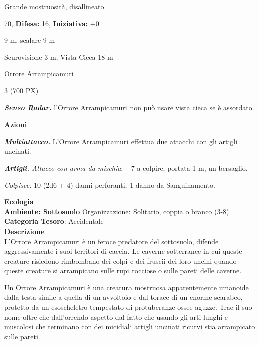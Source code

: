 \begin{multicols}{2}
{
\noindent
\begin{description}[noitemsep, topsep=0pt, parsep=0pt, partopsep=0pt, leftmargin=0cm, labelwidth=2.2cm]
	\item[\textbf{Taglia/Tipo:}] Grande mostruosità, disallineato
	\item[\textbf{Caratt.:}] 
	\item[\textbf{Punti Ferita:}] 70,  \textbf{Difesa:} 16,  \textbf{Iniziativa:} +0
	\item[\textbf{Movimento:}] 9 m, scalare 9 m
	\item[\textbf{Tiri Salvez.:}] 
	\item[\textbf{Sensi:}] Scurovisione 3 m, Vista Cieca 18 m
	\item[\textbf{Linguaggi:}] Orrore Arrampicamuri
	\item[\textbf{Sfida:}] 3 (700 PX)\smallskip
\end{description}

\emph{\textbf{Senso Radar.}} l'Orrore Arrampicamuri non può usare vista cieca se è assordato.

\textbf{Azioni}

\emph{\textbf{Multiattacco.}} L'Orrore Arrampicamuri effettua due attacchi con gli artigli uncinati.

\emph{\textbf{Artigli.} Attacco con arma da mischia}: +7 a colpire, portata 1 m, un bersaglio.

\emph{Colpisce:} 10 (2d6 + 4) danni perforanti, 1 danno da Sanguinamento.

\textbf{Ecologia}\\
\textbf{Ambiente: Sottosuolo}
Organizzazione: Solitario, coppia o branco (3-8)\\
\textbf{Categoria Tesoro}: Accidentale\\
\textbf{Descrizione}\\
L'Orrore Arrampicamuri è un feroce predatore del sottosuolo, difende aggressivamente i suoi territori di caccia. Le caverne sotterranee in cui queste creature risiedono rimbombano dei colpi e dei fruscii dei loro uncini quando queste creature si arrampicano sulle rupi rocciose o sulle pareti delle caverne.

Un Orrore Arrampicamuri è una creatura mostruosa apparentemente umanoide dalla testa simile a quella di un avvoltoio e dal torace di un enorme scarabeo, protetto da un esoscheletro tempestato di protuberanze ossee aguzze. Trae il suo nome oltre che dall'orrendo aspetto dal fatto che usando gli arti lunghi e muscolosi che terminano con dei micidiali artigli uncinati ricurvi stia arrampicato sulle pareti.

}
\end{multicols}
